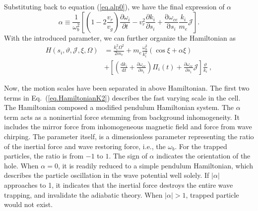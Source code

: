 Substituting back to equation (\ref{eq.alp0}), we have the final expression of $\alpha$
\begin{equation}\label{eq.alp0.5}
    \alpha \equiv \frac{1}{\omega_{b}^2}\left[\left(1 - 2\frac{v_r}{v_g}\right)\frac{\partial \omega_i}{\partial t}  -v_r^2 \frac{\partial k_i}{\partial s_i}+ \frac{\mathrm{\partial} \omega_{ce}}{\mathrm{\partial} s_{i}}\frac{k_i}{m_e}\mathcal{J}\right].
\end{equation}
With the introduced parameter, we can further organize the Hamiltonian as 
\begin{equation}\label{eq.HamiltonianK2}
    \begin{aligned}
    H(s_i,\vartheta,\mathcal{J},\xi,\Omega) &= \frac{k_{i}^{2}\Omega^{2}}{2 m_{e}} + m_e \frac{\omega_b^2}{k_i^2} ( \cos \xi + \alpha \xi) 
    \\
    &+ \left[\left(\frac{\mathrm{d} k_{i}}{\mathrm{d} t}+\frac{\partial \omega_{ce}}{\partial s_{i}}\right) \Pi_{i}(t)+\frac{\partial \omega_{ce}}{\partial s_{i}} \mathcal{J}\right] \frac{\vartheta}{k_{i}}~,
    \end{aligned}
\end{equation}

Now, the motion scales have been separated in above Hamiltonian.
The first two terms in Eq.~(\ref{eq.HamiltonianK2}) describes the fast varying scale in the cell.
The Hamiltonian composed a modified pendulum Hamiltonian system.
The $\alpha$ term acts as a noninertial force stemming from background inhomogeneity.
It includes the mirror force from inhomogeneous magnetic field and force from wave chirping.
The parameter itself, is a dimensionless parameter representing the ratio of the inertial force and wave restoring force, i.e., the $\omega_b$.
For the trapped particles, the ratio is from $-1$ to $1$.
The sign of $\alpha$ indicates the orientation of the hole.
When $\alpha = 0$, it is readily reduced to a simple pendulum Hamiltonian, which describes the particle oscillation in the wave potential well solely.
If $|\alpha|$ approaches to 1, it indicates that the inertial force destroys the entire wave trapping, and invalidate the adiabatic theory.
When $|\alpha|>1$, trapped particle would not exist.

